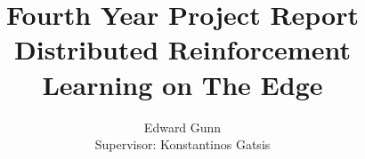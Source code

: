 \documentclass[letterpaper,11pt]{report}
\begin{document}
\title{Fourth Year Project Report \\ \textbf{Distributed Reinforcement Learning on The Edge}}
\author{Edward Gunn \\ Supervisor: Konstantinos Gatsis}
\maketitle 










\end{document}
